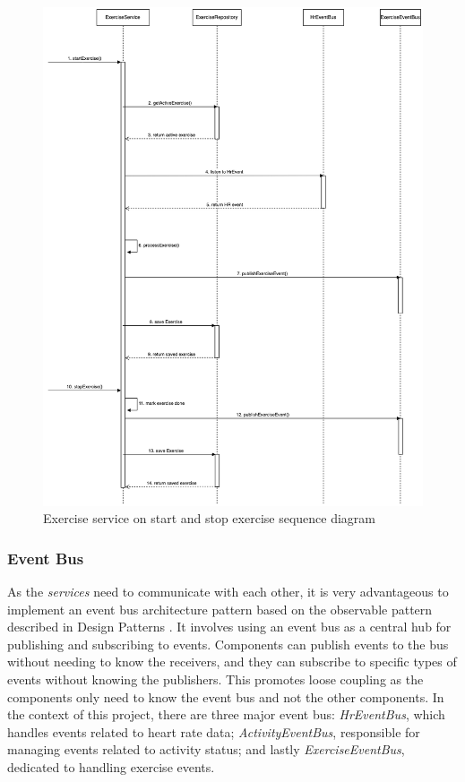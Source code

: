 \begin{figure}[H]
    \centering
    \includegraphics[width=1\textwidth]{diagrams/exercise-service-start.drawio.png}
    \caption{Exercise service on start and stop exercise sequence diagram}
    \label{fig:start_exercise_diagram}
\end{figure}

\subsubsection{Event Bus}
As the \emph{services} need to communicate with each other, it is very advantageous to implement an event bus architecture pattern based on the observable pattern described in Design Patterns \autocite{gamma1995design}. 
It involves using an event bus as a central hub for publishing and subscribing to events. Components can publish events to the bus without needing to know the receivers, and they can subscribe to specific types of events without knowing the publishers.
This promotes loose coupling as the components only need to know the event bus and not the other components.
In the context of this project, there are three major event bus: \emph{HrEventBus}, which handles events related to heart rate data; \emph{ActivityEventBus}, responsible for managing events related to activity status; and lastly \emph{ExerciseEventBus}, dedicated to handling exercise events.

